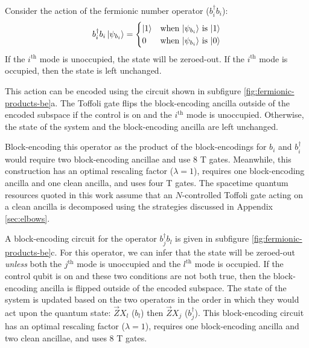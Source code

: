 Consider the action of the fermionic number operator ($b_i^\dagger b_i$):
\begin{equation}
    \begin{split}
        b_i^\dagger b_i \ket{\psi_{b_i}} = \begin{cases} 
            \ket{1} & \text{when $\ket{\psi_{b_i}}$ is $\ket{1}$} \\
            0 & \text{when $\ket{\psi_{b_i}}$ is $\ket{0}$} \\
                                        \end{cases}
    \end{split}
\end{equation}
If the $i^\text{th}$ mode is unoccupied, the state will be zeroed-out.
If the $i^\text{th}$ mode is occupied, then the state is left unchanged.

This action can be encoded using the circuit shown in subfigure \ref{fig:fermionic-products-be}a.
The Toffoli gate flips the block-encoding ancilla outside of the encoded subspace if the control is on and the $i^\text{th}$ mode is unoccupied.
Otherwise, the state of the system and the block-encoding ancilla are left unchanged.

Block-encoding this operator as the product of the block-encodings for $b_i$ and $b_i^\dagger$ would require two block-encoding ancillae and use $8$ T gates.
Meanwhile, this construction has an optimal rescaling factor ($\lambda = 1$), requires one block-encoding ancilla and one clean ancilla, and uses four T gates.
The spacetime quantum resources quoted in this work assume that an $N$-controlled Toffoli gate acting on a clean ancilla is decomposed using the strategies discussed in Appendix \ref{sec:elbows}.

A block-encoding circuit for the operator $b_j^\dagger b_l$ is given in subfigure \ref{fig:fermionic-products-be}c.
For this operator, we can infer that the state will be zeroed-out \textit{unless} both the $j^\text{th}$ mode is unoccupied and the $l^\text{th}$ mode is occupied.
If the control qubit is on and these two conditions are not both true, then the block-encoding ancilla is flipped outside of the encoded subspace.
The state of the system is updated based on the two operators in the order in which they would act upon the quantum state: $\vec{Z}X_l$ ($b_l$) then $\vec{Z}X_j$ ($b_j^\dagger$).
This block-encoding circuit has an optimal rescaling factor ($\lambda = 1$), requires one block-encoding ancilla and two clean ancillae, and uses $8$ T gates.


